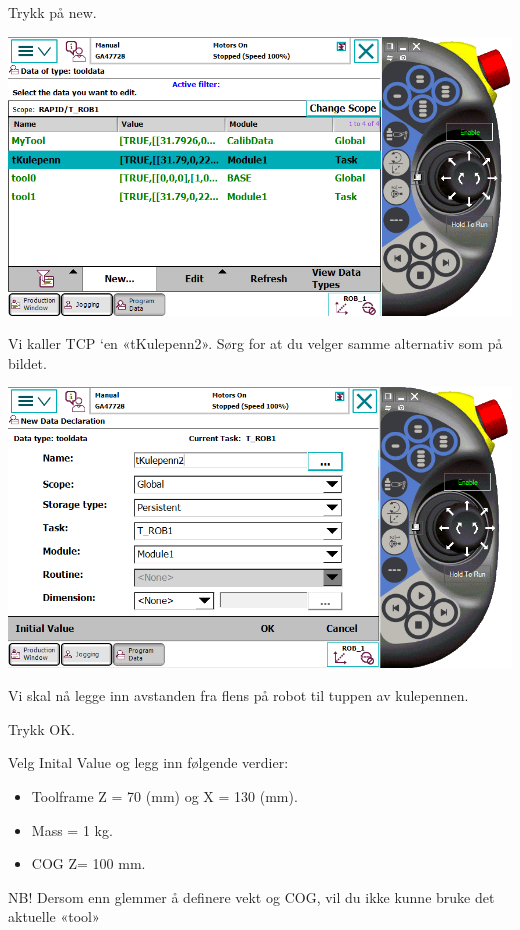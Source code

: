 \vspace{1cm}

Trykk på new.

\vspace{1cm}

\includegraphics[width=1\textwidth]{i04861x07}

\vspace{1cm}

Vi kaller TCP \textquoteleft en «tKulepenn2». Sørg for at du velger
samme alternativ som på bildet.

\vspace{1cm}

\includegraphics[width=1\textwidth]{i04861x08}

\vspace{1cm}

Vi skal nå legge inn avstanden fra flens på robot til tuppen av kulepennen. 

Trykk OK.

\vspace{1cm}

Velg Inital Value og legg inn følgende verdier:
\begin{itemize}
\item Toolframe Z = 70 (mm) og X = 130 (mm). 
\item Mass = 1 kg. 
\item COG Z= 100 mm.
\end{itemize}
NB! Dersom enn glemmer å definere vekt og COG, vil du ikke kunne bruke
det aktuelle «tool»

